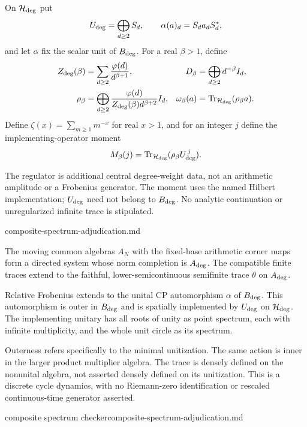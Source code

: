 \begin{definition}
On $\mathcal H_{\rm deg}$ put
\[
 U_{\rm deg}=\bigoplus_{d\geq2}S_d,\qquad
 \alpha(a)_d=S_d a_d S_d^*,
\]
and let $\alpha$ fix the scalar unit of $B_{\rm deg}$.
For a real $\beta>1$, define
\begin{align*}
 Z_{\rm deg}(\beta)&=\sum_{d\geq2}\frac{\varphi(d)}{d^{\beta+1}},&
 D_\beta&=\bigoplus_{d\geq2}d^{-\beta}I_d,\\
 \rho_\beta&=\bigoplus_{d\geq2}
       \frac{\varphi(d)}{Z_{\rm deg}(\beta)d^{\beta+2}}I_d,&
 \omega_\beta(a)&=\operatorname{Tr}_{\mathcal H_{\rm deg}}(\rho_\beta a).
\end{align*}
Define $\zeta(x)=\sum_{m\geq1}m^{-x}$ for real $x>1$, and for an integer
$j$ define the implementing-operator moment
\[
 M_\beta(j)=\operatorname{Tr}_{\mathcal H_{\rm deg}}
                   (\rho_\beta U_{\rm deg}^{\,j}).
\]
\end{definition}
\begin{scope}
The regulator is additional central degree-weight data, not an arithmetic
amplitude or a Frobenius generator. The moment uses the named Hilbert
implementation; $U_{\rm deg}$ need not belong to $B_{\rm deg}$. No
analytic continuation or unregularized infinite trace is stipulated.
\end{scope}
{composite-spectrum-adjudication.md}

\begin{theorem}
\statusProved\quad
The moving common algebras $A_N$ with the fixed-base arithmetic corner
maps form a directed system whose norm completion is $A_{\rm deg}$.
The compatible finite traces extend to the faithful, lower-semicontinuous
semifinite trace $\theta$ on $A_{\rm deg}$.

Relative Frobenius extends to the unital CP automorphism $\alpha$ of
$B_{\rm deg}$. This automorphism is outer in $B_{\rm deg}$ and is spatially
implemented by $U_{\rm deg}$ on $\mathcal H_{\rm deg}$. The implementing
unitary has all roots of unity as point spectrum, each with infinite
multiplicity, and the whole unit circle as its spectrum.
\end{theorem}
\begin{scope}
Outerness refers specifically to the minimal unitization. The same action
is inner in the larger product multiplier algebra. The trace is densely
defined on the nonunital algebra, not asserted densely defined on its
unitization. This is a discrete cycle dynamics, with no Riemann-zero
identification or rescaled continuous-time generator asserted.
\end{scope}
{composite spectrum checker}{composite-spectrum-adjudication.md}

